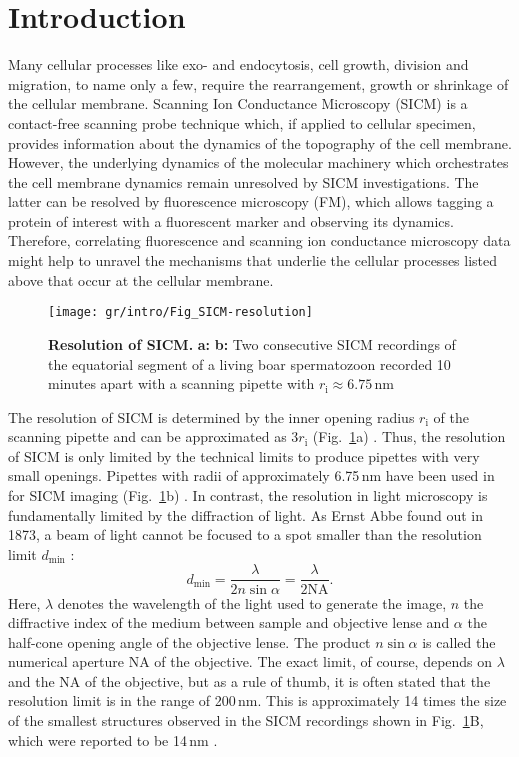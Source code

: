 \section{Introduction}
\label{sec:introduction}
Many cellular processes like exo- and endocytosis, cell growth, division and
migration, to name only a few, require the rearrangement, growth or shrinkage
of the cellular membrane. Scanning Ion Conductance Microscopy (SICM)
\cite{Hansma1989} is a contact-free scanning probe technique which, if applied
to cellular specimen, provides information about the dynamics of the
topography of the cell membrane. However, the underlying dynamics of the
molecular machinery which orchestrates the cell membrane dynamics remain
unresolved by SICM investigations. The latter can be resolved by fluorescence
microscopy (FM), which allows tagging a protein of interest with a fluorescent
marker and observing its dynamics. Therefore, correlating fluorescence and
scanning ion conductance microscopy data might help to unravel the mechanisms
that underlie the cellular processes listed above that occur at the cellular
membrane.

\begin{figure}
  \sidecaption[t]
  \texttt{[image: gr/intro/Fig\_SICM-resolution]}
  \caption{\textbf{Resolution of SICM.} \textbf{a:} \textbf{b:} Two
    consecutive SICM recordings of the equatorial segment of a living boar
    spermatozoon recorded 10 minutes apart with a scanning pipette with
    $r_\mathrm{i} \approx 6.75\,\text{nm}$}
  \label{fig:sicm-resolution}
\end{figure}
  
The resolution of SICM is determined by the inner opening radius
$r_\mathrm{i}$ of the scanning pipette and can be approximated as
$3r_\mathrm{i}$ (Fig.~\ref{fig:sicm-resolution}a)
\cite{rheinlaender:094905,Rheinlaender2015}.  Thus, the resolution of SICM is
only limited by the technical limits to produce pipettes with very small
openings. Pipettes with radii of approximately 6.75\,nm have been used in for
SICM imaging (Fig.~\ref{fig:sicm-resolution}b) \cite{Shevchuk2008}. In
contrast, the resolution in light microscopy is fundamentally limited by the
diffraction of light. As Ernst Abbe found out in 1873, a beam of light cannot
be focused to a spot smaller than the resolution limit $d_\text{min}$
\cite{Abbe1873}:
\begin{equation}
  d_\text{min} = \frac\lambda{2n\sin\alpha} = \frac\lambda{2\mathrm{NA}}\text{.}
  \label{eq:diffraction-limit}
\end{equation}
Here, $\lambda$ denotes the wavelength of the light used to generate the
image, $n$ the diffractive index of the medium between sample and objective
lense and $\alpha$ the half-cone opening angle of the objective lense. The
product $n\sin\alpha$ is called the numerical aperture $\mathrm{NA}$ of the
objective. The exact limit, of course, depends on $\lambda$ and the NA of the
objective, but as a rule of thumb, it is often stated that the resolution
limit is in the range of 200\,nm. This is approximately 14 times the size of
the smallest structures observed in the SICM recordings shown in
Fig.~\ref{fig:sicm-resolution}B, which were reported to be 14\,nm
\cite{Shevchuk2008}.

